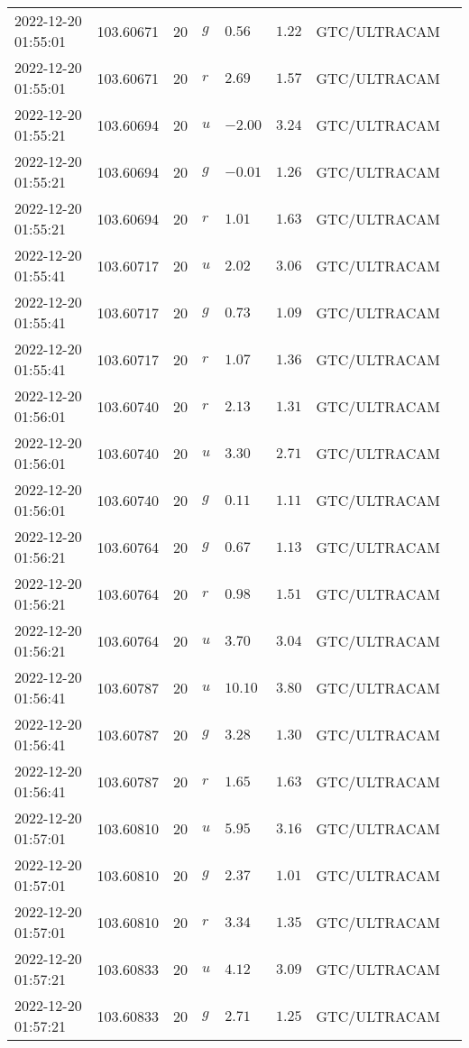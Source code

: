 \documentclass{nature_plusfigure}
\begin{document}
\begin{supplement}
\begin{center}
\begin{longtable}{llllllll}
2022-12-20 01:55:01 & 103.60671 & 20 & $g$ & $0.56$ & $1.22$ & GTC/ULTRACAM &  \\ 
2022-12-20 01:55:01 & 103.60671 & 20 & $r$ & $2.69$ & $1.57$ & GTC/ULTRACAM &  \\ 
2022-12-20 01:55:21 & 103.60694 & 20 & $u$ & $-2.00$ & $3.24$ & GTC/ULTRACAM &  \\ 
2022-12-20 01:55:21 & 103.60694 & 20 & $g$ & $-0.01$ & $1.26$ & GTC/ULTRACAM &  \\ 
2022-12-20 01:55:21 & 103.60694 & 20 & $r$ & $1.01$ & $1.63$ & GTC/ULTRACAM &  \\ 
2022-12-20 01:55:41 & 103.60717 & 20 & $u$ & $2.02$ & $3.06$ & GTC/ULTRACAM &  \\ 
2022-12-20 01:55:41 & 103.60717 & 20 & $g$ & $0.73$ & $1.09$ & GTC/ULTRACAM &  \\ 
2022-12-20 01:55:41 & 103.60717 & 20 & $r$ & $1.07$ & $1.36$ & GTC/ULTRACAM &  \\ 
2022-12-20 01:56:01 & 103.60740 & 20 & $r$ & $2.13$ & $1.31$ & GTC/ULTRACAM &  \\ 
2022-12-20 01:56:01 & 103.60740 & 20 & $u$ & $3.30$ & $2.71$ & GTC/ULTRACAM &  \\ 
2022-12-20 01:56:01 & 103.60740 & 20 & $g$ & $0.11$ & $1.11$ & GTC/ULTRACAM &  \\ 
2022-12-20 01:56:21 & 103.60764 & 20 & $g$ & $0.67$ & $1.13$ & GTC/ULTRACAM &  \\ 
2022-12-20 01:56:21 & 103.60764 & 20 & $r$ & $0.98$ & $1.51$ & GTC/ULTRACAM &  \\ 
2022-12-20 01:56:21 & 103.60764 & 20 & $u$ & $3.70$ & $3.04$ & GTC/ULTRACAM &  \\ 
2022-12-20 01:56:41 & 103.60787 & 20 & $u$ & $10.10$ & $3.80$ & GTC/ULTRACAM &  \\ 
2022-12-20 01:56:41 & 103.60787 & 20 & $g$ & $3.28$ & $1.30$ & GTC/ULTRACAM &  \\ 
2022-12-20 01:56:41 & 103.60787 & 20 & $r$ & $1.65$ & $1.63$ & GTC/ULTRACAM &  \\ 
2022-12-20 01:57:01 & 103.60810 & 20 & $u$ & $5.95$ & $3.16$ & GTC/ULTRACAM &  \\ 
2022-12-20 01:57:01 & 103.60810 & 20 & $g$ & $2.37$ & $1.01$ & GTC/ULTRACAM &  \\ 
2022-12-20 01:57:01 & 103.60810 & 20 & $r$ & $3.34$ & $1.35$ & GTC/ULTRACAM &  \\ 
2022-12-20 01:57:21 & 103.60833 & 20 & $u$ & $4.12$ & $3.09$ & GTC/ULTRACAM &  \\ 
2022-12-20 01:57:21 & 103.60833 & 20 & $g$ & $2.71$ & $1.25$ & GTC/ULTRACAM &  \\ 

\end{longtable}
\end{center}
\end{supplement}
\end{document}
